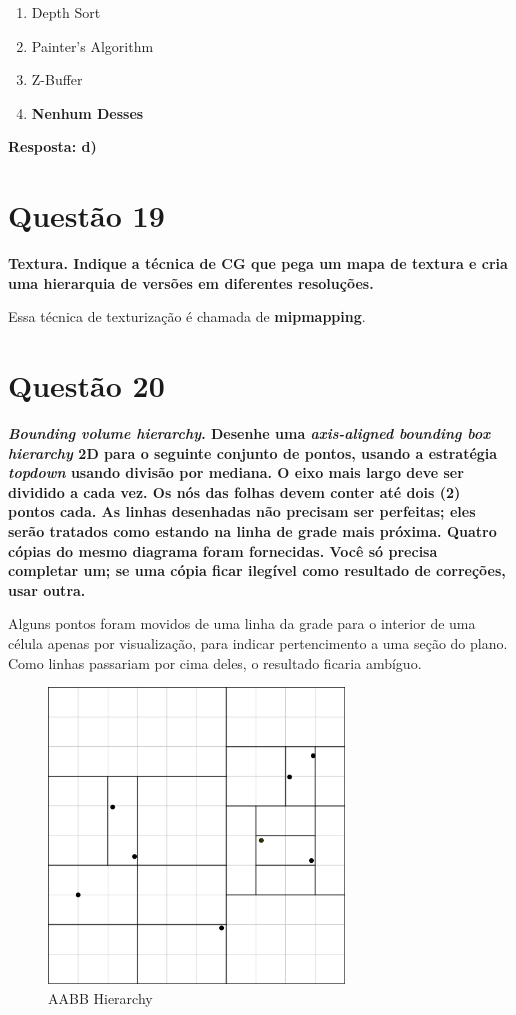 \documentclass[12pt]{exam}
\begin{document}
\begin{enumerate}[label=\alph*)]
    \item Depth Sort
    \item Painter's Algorithm
    \item Z-Buffer
    \item \textbf{Nenhum Desses}
\end{enumerate}

\textbf{Resposta: d)}

\section*{Questão 19}
{\bfseries Textura. Indique a técnica de CG que pega um mapa de textura e cria uma hierarquia de versões em diferentes resoluções.}

Essa técnica de texturização é chamada de \textbf{mipmapping}.

\section*{Questão 20}
{\bfseries \textit{Bounding volume hierarchy}. Desenhe uma \textit{axis-aligned bounding box hierarchy} 2D para o seguinte conjunto de pontos, usando a estratégia \textit{topdown} usando divisão por mediana. O eixo mais largo deve ser dividido a cada vez. Os nós das folhas devem conter até dois (2) pontos cada. As linhas desenhadas não precisam ser perfeitas; eles serão tratados como estando na linha de grade mais próxima. Quatro cópias do mesmo diagrama foram fornecidas. Você só precisa completar um; se uma cópia ficar ilegível como resultado de correções, usar outra.}

Alguns pontos foram movidos de uma linha da grade para o interior de uma célula apenas por visualização, para indicar pertencimento a uma seção do plano. Como linhas passariam por cima deles, o resultado ficaria ambíguo.

\begin{figure}[ht]
    \centering
    \includegraphics[width=0.7\textwidth]{images/20p2.png}
    \caption{AABB Hierarchy}
    \label{fig:20}
\end{figure}
\end{document}
